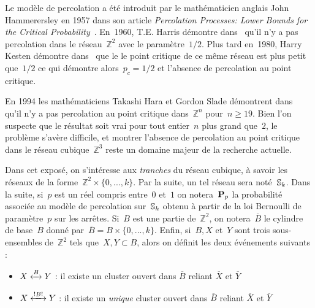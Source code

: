 \vspace*{0.3cm}
	Le modèle de percolation a été introduit par le mathématicien anglais John Hammerersley en 1957 dans son article \emph{Percolation Processes: Lower Bounds for the Critical Probability}~\cite{hammer}. En~1960, T.E. Harris démontre dans~\cite{harris} qu'il n'y a pas percolation dans le réseau~$\mathbb{Z}^2$ avec le paramètre~$1/2$. Plus tard en~1980, Harry Kesten démontre dans~\cite{kesten} que le le point critique de ce même réseau est plus petit que~$1/2$ ce qui démontre alors~$p_c=1/2$ et l'absence de percolation au point critique.
	
	En 1994 les mathématiciens Takashi Hara et Gordon Slade démontrent dans~\cite{mean} qu'il n'y a pas percolation au point critique dans~$\mathbb{Z}^n$ pour~$n\geq 19$. Bien l'on suspecte que le résultat soit vrai pour tout entier~$n$ plus grand que~$2$, le problème s'avère difficile, et montrer l'absence de percolation au point critique dans le réseau cubique~$\mathbb{Z}^3$ reste un domaine majeur de la recherche actuelle.
	
	Dans cet exposé, on s'intéresse aux \emph{tranches} du réseau cubique, à savoir les réseaux de la forme~$\mathbb{Z}^2\times\{0,...,k\}$. Par la suite, un tel réseau sera noté~$\Sk$. \marginnote{$\Sk$}
	Dans la suite, si~$p$ est un réel compris entre~$0$ et~$1$ on notera~$\PpSP$ \marginnote{$\PpSP$} la probabilité associée au modèle de percolation sur~$\Sk$ obtenu à partir de la loi Bernoulli de paramètre~$p$ sur les arrêtes. Si~$B$ est une partie de~$\mathbb{Z}^2$, on notera~$\overline{B}$  le cylindre de base~$B$ donné par~$\overline{B}=B\times\{0,...,k\}$. 	
	Enfin, si~$B, X$ et~$Y$ sont trois sous-ensembles de~$\mathbb{Z}^2$ tels que~$X,Y\subset B$, alors on définit les deux événements suivants :
	\begin{itemize}
		\item[] $\relie[B]{X}{Y}$  : \og{} il existe un cluster ouvert dans $\overline{B}$ reliant $\overline{X}$ et $\overline{Y}$  \fg{}
		\item[] $\relie*[B]{X}{Y}$  :  \og{} il existe un \emph{unique} cluster ouvert dans $\overline{B}$ reliant $\overline{X}$ et $\overline{Y}$  \fg{}
	\end{itemize}
	